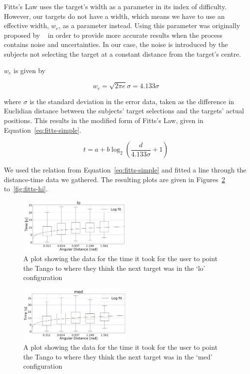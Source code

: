 \documentclass[format=sigconf, review=true, screen=true, anonymous=true]{acmart}
\begin{document}
Fitts's Law uses the target's width as a parameter in its index of difficulty. However, our targets do not have a width, which means we have to use an effective width, $w_e$, as a parameter instead. Using this parameter was originally proposed by \citeauthor{mackenzie1992fitts}~\cite{mackenzie1992fitts} in order to provide more accurate results when the process contains noise and uncertainties. In our case, the noise is introduced by the subjects not selecting the target at a constant distance from the target's centre. 

$w_e$ is given by 

\[
  w_e = \sqrt{2\pi e}\sigma = 4.133\sigma
\]

where $\sigma$ is the standard deviation in the error data, taken as the difference in Euclidian distance between the subjects' target selections and the targets' actual positions. This results in the modified form of Fitts's Law, given in Equation~\ref{eq:fitts-simple}.

\begin{equation}
  \label{eq:fitts-simple}
  t = a + b\log_2\left(\frac{d}{4.133\sigma} + 1\right)
\end{equation}

We used the relation from Equation~\ref{eq:fitts-simple} and fitted a line through the distance-time data we gathered. The resulting plots are given in Figures~\ref{fig:fitts-lo} to~\ref{fig:fitts-hi}. 

\begin{figure}
  \centering
  \includegraphics[width=0.5\textwidth]{figures/fitts_lo.png}
  \caption{A plot showing the data for the time it took for the user to point the Tango to where they think the next target was in the `lo' configuration}
  \label{fig:fitts-lo}
\end{figure}

\begin{figure}
  \centering
  \includegraphics[width=0.5\textwidth]{figures/fitts_med.png}
  \caption{A plot showing the data for the time it took for the user to point the Tango to where they think the next target was in the `med' configuration}
  \label{fig:fitts-lo}
\end{figure}
\end{document}
